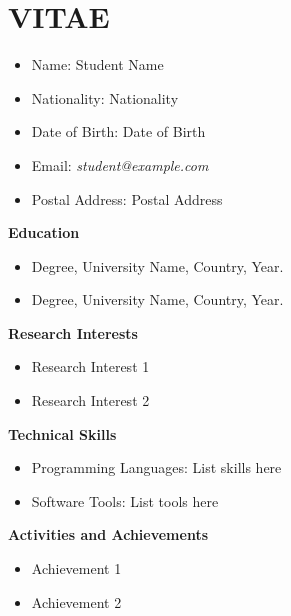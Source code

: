 

\newpage
{} %
\label{vitae}

\chapter*{\centering VITAE}

\begin{itemize}
  \item Name: Student Name
  \item Nationality: Nationality
  \item Date of Birth: Date of Birth
  \item Email: \emph{student@example.com}
  \item Postal Address: Postal Address
\end{itemize}

\textbf{Education}
\begin{itemize}
    \item Degree, University Name, Country, Year.

    \item Degree, University Name, Country, Year.
\end{itemize}

\textbf{Research Interests}
\begin{itemize}
    \item Research Interest 1
    \item Research Interest 2
\end{itemize}

\textbf{Technical Skills}
\begin{itemize}
    \item Programming Languages: List skills here
    \item Software Tools: List tools here
\end{itemize}

\textbf{Activities and Achievements}
\begin{itemize}
    \item Achievement 1
    \item Achievement 2
\end{itemize}
